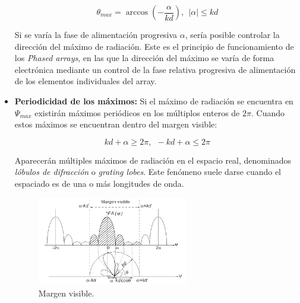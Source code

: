 \begin{itemize}
 \begin{equation}
	\theta_{max}=\arccos(-\frac{\alpha}{kd}),\ \ \left | \alpha \right |\leq kd
	\label{eq:radmax}
\end{equation}

\par Si se varía la fase de alimentación progresiva $\alpha$, sería posible controlar la dirección del máximo de radiación. Este es el principio de funcionamiento de los \textit{Phased arrays}, en las que la dirección del máximo se varía de forma electrónica mediante un control de la fase relativa progresiva de alimentación de los elementos individuales del array. 

\item \textbf{Periodicidad de los máximos: }Si el máximo de radiación se encuentra en $\Psi_{max}$ existirán máximos periódicos en los múltiplos enteros de $2\pi$. Cuando estos máximos se encuentran dentro del margen visible:

\begin{equation}
	kd+\alpha\geq 2\pi,\ \
-kd+\alpha\leq 2\pi  
\label{eq:maxdominio}
\end{equation}


\par Aparecerán múltiples máximos de radiación en el espacio real, denominados \textit{lóbulos de difracción} o \textit{grating lobes}. Este fenómeno suele darse cuando el espaciado es de una o más longitudes de onda.
\begin{figure}[h]
    \centering
        \includegraphics[width=0.62\textwidth]{archivos/array/margen}
        \caption{Margen visible. \cite{Cardama2002}}
        \label{fig:margenvisible}
\end{figure}

\end{itemize}





